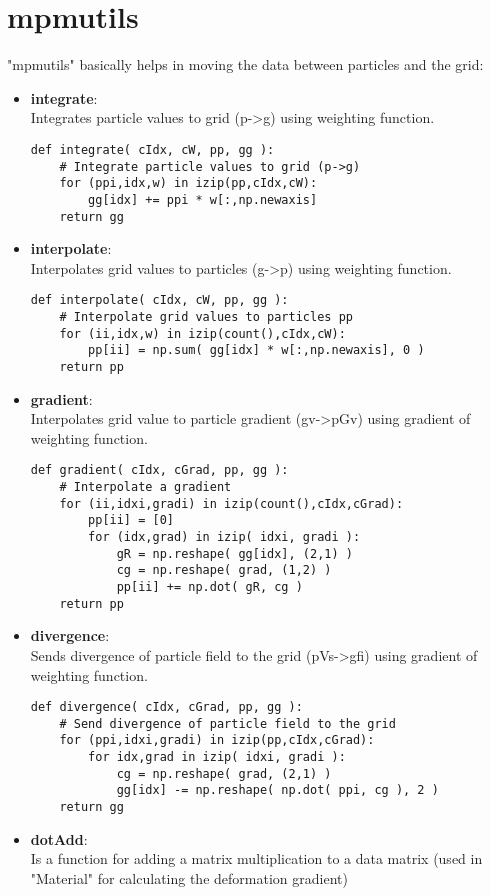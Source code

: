 \chapter{mpmutils}
\label{chap:mpmutils}
"mpmutils" basically helps in moving the data between particles and the grid:
\begin{itemize}
\item \textbf{integrate}:\\ Integrates particle values to grid (p->g) using weighting function.
\begin{lstlisting}
def integrate( cIdx, cW, pp, gg ):
    # Integrate particle values to grid (p->g)
    for (ppi,idx,w) in izip(pp,cIdx,cW):
        gg[idx] += ppi * w[:,np.newaxis]
    return gg     
\end{lstlisting}
\item \textbf{interpolate}:\\ Interpolates grid values to particles (g->p) using weighting function.
\begin{lstlisting}
def interpolate( cIdx, cW, pp, gg ):
    # Interpolate grid values to particles pp
    for (ii,idx,w) in izip(count(),cIdx,cW):
        pp[ii] = np.sum( gg[idx] * w[:,np.newaxis], 0 )
    return pp
\end{lstlisting}
\item \textbf{gradient}:\\ Interpolates grid value to particle gradient (gv->pGv) using gradient of weighting function.
\begin{lstlisting}
def gradient( cIdx, cGrad, pp, gg ):
    # Interpolate a gradient
    for (ii,idxi,gradi) in izip(count(),cIdx,cGrad):
        pp[ii] = [0]
        for (idx,grad) in izip( idxi, gradi ):
            gR = np.reshape( gg[idx], (2,1) )
            cg = np.reshape( grad, (1,2) )
            pp[ii] += np.dot( gR, cg )
    return pp    
\end{lstlisting}
\item \textbf{divergence}:\\ Sends divergence of particle field to the grid (pVs->gfi) using gradient of weighting function.
\begin{lstlisting}
def divergence( cIdx, cGrad, pp, gg ):
    # Send divergence of particle field to the grid
    for (ppi,idxi,gradi) in izip(pp,cIdx,cGrad):
        for idx,grad in izip( idxi, gradi ):
            cg = np.reshape( grad, (2,1) )            
            gg[idx] -= np.reshape( np.dot( ppi, cg ), 2 )
    return gg       
\end{lstlisting}
\item \textbf{dotAdd}:\\ Is a function for adding a matrix multiplication to a data matrix (used in "Material" for calculating the deformation gradient)

\end{itemize}
